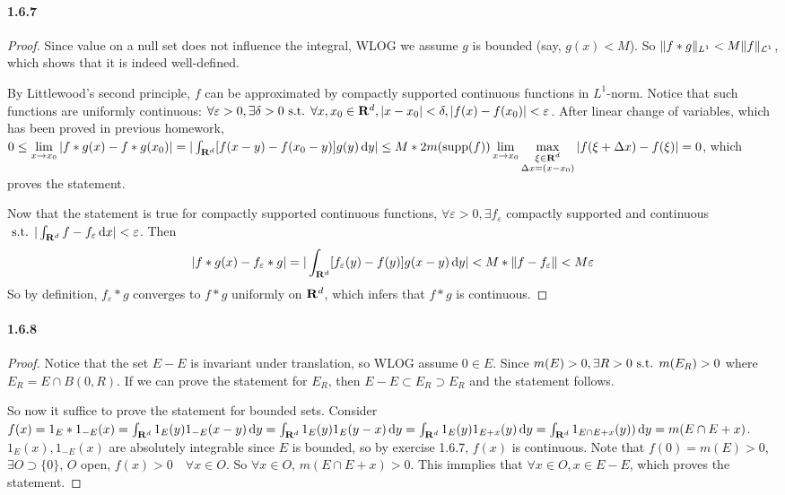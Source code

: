 \documentclass{article}
\begin{document}
\paragraph{1.6.7}
\begin{proof}
Since value on a null set does not influence the integral, WLOG we assume $g$ is bounded (say, $g(x)<M$). So $\|f*g\|_{L^1}<M\|f\|_{\mathcal{L}^1}$, which shows that it is indeed well-defined.

By Littlewood's second principle, $f$ can be approximated by compactly supported continuous functions in $L^1$-norm. Notice that such functions are uniformly continuous: $\forall \varepsilon>0,\exists \delta>0\text{ s.t. } \forall x,x_0\in\mathbf{R}^d, |x-x_0|<\delta, |f(x)-f(x_0)|<\varepsilon$. After linear change of variables, which has been proved in previous homework, $0\leq \lim\limits_{x\to x_0}|f*g(x)-f*g(x_0)|=|\int_{\mathbf{R}^d}[f(x-y)-f(x_0-y)]g(y)\,\mathrm{d} y|\leq M *2m(\mathrm{supp}(f))\lim\limits_{x\to x_0}\max\limits_{\substack{\xi\in\mathbf{R}^d\\ \Delta x=(x-x_0)}}|f(\xi+\Delta x)-f(\xi)|=0$, which proves the statement.  

Now that the statement is true for compactly supported continuous functions, $\forall\varepsilon>0,\exists f_\varepsilon$ compactly supported and continuous$\text{ s.t. } |\int_{\mathbf{R}^d}f-f_\varepsilon\,\mathrm{d} x|<\varepsilon$. Then 
\[|f*g(x)-f_\varepsilon *g|=|\int_{\mathbf{R}^d}[f_\varepsilon(y)-f(y)]g(x-y)\,\mathrm{d} y|<M*\|f-f_\varepsilon\|<M\varepsilon\]
So by definition, $f_\varepsilon * g$ converges to $f*g$ uniformly on $\mathbf{R}^d$, which infers that $f*g$ is continuous.
\end{proof}

\paragraph{1.6.8}
\begin{proof}
Notice that the set $E-E$ is invariant under translation, so WLOG assume $0\in E$. Since $m(E)>0,\exists R>0\text{ s.t. } m(E_R)>0$ where $E_R=E\cap B(0,R)$. If we can prove the statement for $E_R$, then $E-E\subset E_R\supset E_R$ and the statement follows.

So now it suffice to prove the statement for bounded sets. Consider $f(x)=1_E*1_{-E}(x)=\int_{\mathbf{R}^d}1_E(y)1_{-E}(x-y)\,\mathrm{d} y=\int_{\mathbf{R}^d}1_E(y)1_E(y-x)\,\mathrm{d} y=\int_{\mathbf{R}^d}1_E(y)1_{E+x}(y)\,\mathrm{d} y=\int_{\mathbf{R}^d}1_{E\cap E+x}(y))\,\mathrm{d} y=m(E\cap E+x)$. $1_E(x),1_{-E}(x)$ are absolutely integrable since $E$ is bounded, so by exercise 1.6.7, $f(x)$ is continuous. Note that $f(0)=m(E)>0$, $\exists O\supset \{0\}$, $O$ open, $f(x)>0\quad \forall x\in O$. So $\forall x\in O$, $m(E\cap E+x)>0$. This immplies that $\forall x\in O, x\in E-E$, which proves the statement.
\end{proof}
\end{document}
